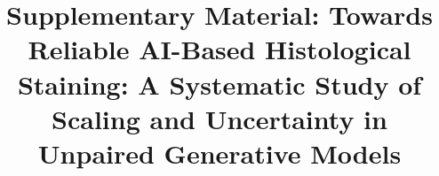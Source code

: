 \documentclass{bmvc2k}
\title{Supplementary Material: Towards Reliable AI-Based Histological Staining: 
A Systematic Study of Scaling and Uncertainty in Unpaired Generative Models}
\begin{document}
\renewcommand{\thefigure}{S\arabic{figure}}
\renewcommand{\thetable}{S\arabic{table}}

\maketitle





\end{document}
